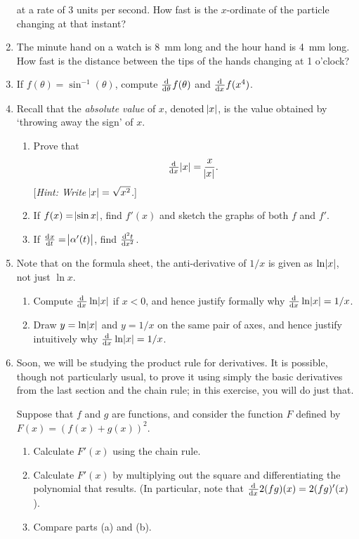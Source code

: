 \begin{enumerate}
        at a rate of 3 units per second. How fast is the $ x$-ordinate of the particle changing at that instant?
  \item The minute hand on a watch is \SI{8}{\milli\metre} long and the hour hand is \SI{4}{\milli\metre} long. How fast is the
        distance between the tips of the hands changing at 1 o'clock?
  \item If $ f(\theta) = \sin^{-1} (\theta) $, compute $ \od{}{\theta} f(\theta) $ and $ \od{}{x} f(x^4) $.
  \item Recall that the \emph{absolute value} of $ x $, denoted $ \abs{x} $, is the value obtained by `throwing away the sign' of $ x $.
    \begin{enumerate}
      \item Prove that
            \begin{displaymath}
              \od{}{x} \abs{x} = \frac{x}{\abs{x}}.
            \end{displaymath}
            [\textit{Hint: Write $ \abs{x} = \sqrt{x^2} $.}]
      \item If $ f(x) = \abs{\sin x} $, find $ f'(x) $ and sketch the graphs of both $ f $ and $ f' $.
      \item If $ \od{x}{t} = \abs{\alpha'(t)} $, find $ \od[2]{t}{x} $.
    \end{enumerate}
  \item Note that on the formula sheet, the anti-derivative of $ 1/x $ is given as $ \ln \abs{x} $, not just $ \ln x $.
    \begin{enumerate}
      \item Compute $ \od{}{x} \ln \abs{x} $ if $ x < 0 $, and hence justify formally why $ \od{}{x} \ln \abs{x} = 1/x $.
      \item Draw $ y = \ln \abs{x} $ and $ y = 1/x $ on the same pair of axes, and hence justify intuitively why $ \od{}{x} \ln \abs{x} = 1/x $.
    \end{enumerate}
  \item Soon, we will be studying the product rule for derivatives. It is possible, though not
        particularly usual, to prove it using simply the basic derivatives from the last section and the chain
        rule; in this exercise, you will do just that.

        Suppose that $ f $ and $ g $ are functions, and consider the function $ F $ defined by $ F(x) = \left(f(x) + g(x)\right)^2 $.
    \begin{enumerate}
      \item Calculate $ F'(x) $ using the chain rule.
      \item Calculate $ F'(x) $ by multiplying out the square and differentiating the polynomial that results. (In particular, note
            that $ \od{}{x} 2(fg)(x) = 2 (fg)'(x) $).
      \item Compare parts (a) and (b).
    \end{enumerate}
\end{enumerate}

